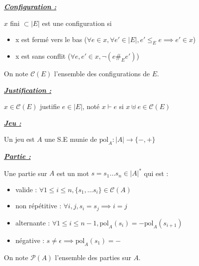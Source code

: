\documentclass[a4paper,12ptCOUCOU
]{article}
\newlength{\mydepth}
\newlength{\myheight}
\newenvironment{answer}
{\par\begin{lrbox}{\mybox}\quad\begin{minipage}{\linewidth}\color{black}\setlength{\parskip}{10pt plus 1pt minus 1pt}\vspace*{-.7\baselineskip}}
{\end{minipage}\end{lrbox}
\settodepth{\mydepth}{\usebox{\mybox}}
\settoheight{\myheight}{\usebox{\mybox}}
\addtolength{\myheight}{\mydepth}
\noindent\makebox[0pt]{
  \color{gray}\hspace{-0pt}\rule[-\mydepth]{1pt}{\myheight}}
\usebox{\mybox}
  }
\begin{document}
\begin{samepage}\textbf{\textit{\underline{ Configuration : }}} \begin{answer}

$x$ fini $\subset |E|$ est une configuration si
\begin{itemize}
\item x est fermé vers le bas
($\forall e \in x, \forall e' \in |E|, e' \leq_E e \implies e' \in x$)

\item x est sans conflit
($\forall e, e' \in x, \neg (e \#_E e')$)
\end{itemize}
\end{answer}\end{samepage}
On note $\mathcal{C}(E)$ l'ensemble des configurations de $E$.

\begin{samepage}\textbf{\textit{\underline{ Justification : }}} \begin{answer}
$x \in \mathcal{C}(E)$ justifie $e \in |E|$, noté $x \vdash e$ si $x \uplus e \in \mathcal{C}(E)$
\end{answer}\end{samepage}

\begin{samepage}\textbf{\textit{\underline{ Jeu : }}} \begin{answer}
Un jeu est $A$ une S.E munie de $\text{pol}_A : |A| \rightarrow \{-, +\}$
\end{answer}\end{samepage}

\begin{samepage}\textbf{\textit{\underline{ Partie : }}} \begin{answer}
Une partie sur $A$ est un mot $s = s_1 \dots s_n \in |A|^*$ qui est :
\begin{itemize}
\item valide :
$\forall 1\leq i \leq n, \{s_1, \dots s_i\} \in \mathcal{C}(A)$

\item non répétitive :
$\forall i, j, s_i = s_j \implies i = j$

\item alternante :
$\forall 1 \leq i \leq n-1, \text{pol}_A(s_i) = - \text{pol}_A(s_{i+1})$

\item négative :
$s \neq \epsilon \implies \text{pol}_A(s_1) = -$
\end{itemize}
\end{answer}\end{samepage}
On note $\mathcal{P}(A)$ l'ensemble des parties sur $A$.
\end{document}
